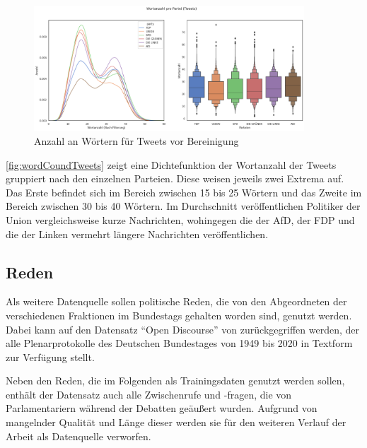 
\begin{figure}[H]
    \centering
    \includegraphics[width=0.9\textwidth]{data/images/tweets_word_count.png}
    \caption{Anzahl an Wörtern für Tweets vor Bereinigung} \label{fig:wordCoundTweets}
\end{figure}


\autoref{fig:wordCoundTweets} zeigt eine Dichtefunktion der Wortanzahl der Tweets gruppiert nach den einzelnen Parteien. Diese weisen jeweils zwei Extrema auf. Das Erste befindet sich im Bereich zwischen \num{15} bis \num{25} Wörtern und das Zweite im Bereich zwischen \num{30} bis \num{40} Wörtern. Im Durchschnitt veröffentlichen Politiker der Union vergleichsweise kurze Nachrichten, wohingegen die der \ac{AfD}, der \ac{FDP} und die der Linken vermehrt längere Nachrichten veröffentlichen.

\subsection*{Reden} \label{subsec:dataUnderstandingReden}

Als weitere Datenquelle sollen politische Reden, die von den Abgeordneten der verschiedenen Fraktionen im Bundestags gehalten worden sind, genutzt werden. Dabei kann auf den Datensatz \enquote{Open Discourse} von \textcite{richter_open_2021} zurückgegriffen werden, der alle Plenarprotokolle des Deutschen Bundestages von \num{1949} bis \num{2020} in Textform zur Verfügung stellt.

Neben den Reden, die im Folgenden als Trainingsdaten genutzt werden sollen, enthält der Datensatz auch alle Zwischenrufe und -fragen, die von Parlamentariern während der Debatten geäußert wurden. Aufgrund von mangelnder Qualität und Länge dieser werden sie für den weiteren Verlauf der Arbeit als Datenquelle verworfen.


